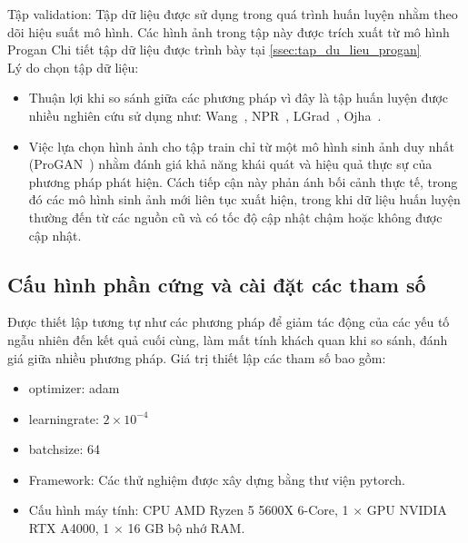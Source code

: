 Tập \gls{validation}:
%
Tập dữ liệu được sử dụng trong quá trình huấn luyện nhằm theo dõi hiệu suất mô hình. Các hình ảnh trong tập này được trích xuất từ mô hình Progan
%
Chi tiết tập dữ liệu được trình bày tại \ref{ssec:tap_du_lieu_progan}\\
%
Lý do chọn tập dữ liệu:
\begin{itemize}
	\item Thuận lợi khi so sánh giữa các phương pháp vì đây là tập huấn luyện được nhiều nghiên cứu sử dụng như: Wang~\cite{Wang2019CNNGeneratedIA}, NPR~\cite{Tan2023RethinkingTU}, LGrad~\cite{Tan2023LearningOG}, Ojha~\cite{Ojha2023TowardsUF}. 
	\item Việc lựa chọn hình ảnh cho tập \gls{train} chỉ từ một mô hình sinh ảnh duy nhất (ProGAN~\cite{karras2018progressive}) nhằm đánh giá khả năng khái quát và hiệu quả thực sự của phương pháp phát hiện. Cách tiếp cận này phản ánh bối cảnh thực tế, trong đó các mô hình sinh ảnh mới liên tục xuất hiện, trong khi dữ liệu huấn luyện thường đến từ các nguồn cũ và có tốc độ cập nhật chậm hoặc không được cập nhật.
\end{itemize}


\subsection{Cấu hình phần cứng và cài đặt các tham số} Được thiết lập tương tự như các phương pháp \cite{Wang2019CNNGeneratedIA, Tan2023RethinkingTU,Tan2023LearningOG} để giảm tác động của các yếu tố ngẫu nhiên đến kết quả cuối cùng, làm mất tính khách quan khi so sánh, đánh giá giữa nhiều phương pháp. Giá trị thiết lập các tham số bao gồm:
	\begin{itemize}
		\item \Gls{optimizer}: \Gls{adam}
		\item \Gls{learningrate}: $2 \times 10^{-4}$
		\item \Gls{batchsize}: 64
		\item Framework: Các thử nghiệm được xây dựng bằng thư viện \Gls{pytorch}.
		\item Cấu hình máy tính: CPU AMD Ryzen 5 5600X 6-Core, 1 $\times$ GPU NVIDIA RTX A4000, 1 $\times$ 16 GB bộ nhớ RAM.
	\end{itemize}

